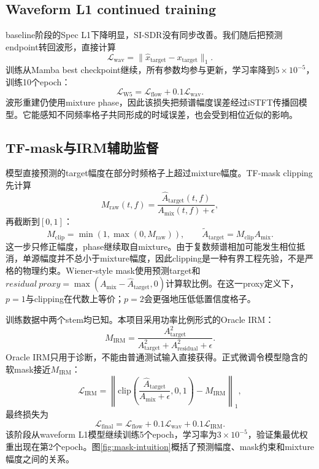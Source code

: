 \documentclass[UTF8,12pt,a4paper]{ctexart}
\begin{document}
\subsection{Waveform L1 continued training}

baseline阶段的Spec L1下降明显，SI-SDR没有同步改善。我们随后把预测endpoint转回波形，直接计算
\begin{equation}
  \mathcal L_{\mathrm{wav}}=\|\hat x_{\mathrm{target}}-x_{\mathrm{target}}\|_1.
\end{equation}
训练从Mamba best checkpoint继续，所有参数均参与更新，学习率降到$5\times10^{-5}$，训练10个epoch：
\begin{equation}
  \mathcal L_{\mathrm{W5}}=\mathcal L_{\mathrm{flow}}+0.1\mathcal L_{\mathrm{wav}}.
\end{equation}
波形重建仍使用mixture phase，因此该损失把频谱幅度误差经过iSTFT传播回模型。它能感知不同频率格子共同形成的时域误差，也会受到相位近似的影响。

\subsection{TF-mask与IRM辅助监督}

模型直接预测的target幅度在部分时频格子上超过mixture幅度。TF-mask clipping先计算
\begin{equation}
  M_{\mathrm{raw}}(t,f)=\frac{\hat A_{\mathrm{target}}(t,f)}{A_{\mathrm{mix}}(t,f)+\epsilon},
\end{equation}
再截断到$[0,1]$：
\begin{equation}
  M_{\mathrm{clip}}=\min(1,\max(0,M_{\mathrm{raw}})),\qquad
  \tilde A_{\mathrm{target}}=M_{\mathrm{clip}}A_{\mathrm{mix}}.
\end{equation}
这一步只修正幅度，phase继续取自mixture。由于复数频谱相加可能发生相位抵消，单源幅度并不总小于mixture幅度，因此clipping是一种有界工程先验，不是严格的物理约束。Wiener-style mask使用预测target和$residual\ proxy=\max(A_{\mathrm{mix}}-\hat A_{\mathrm{target}},0)$计算软比例。在这一proxy定义下，$p=1$与clipping在代数上等价；$p=2$会更强地压低低置信度格子。

训练数据中两个stem均已知。本项目采用功率比例形式的Oracle IRM：
\begin{equation}
  M_{\mathrm{IRM}}=\frac{A_{\mathrm{target}}^2}
  {A_{\mathrm{target}}^2+A_{\mathrm{residual}}^2+\epsilon}.
\end{equation}
Oracle IRM只用于诊断，不能由普通测试输入直接获得。正式微调令模型隐含的软mask接近$M_{\mathrm{IRM}}$：
\begin{equation}
  \mathcal L_{\mathrm{IRM}}=\left\lVert
  \mathrm{clip}\left(\frac{\hat A_{\mathrm{target}}}{A_{\mathrm{mix}}+\epsilon},0,1\right)
  -M_{\mathrm{IRM}}\right\rVert_1,
\end{equation}
最终损失为
\begin{equation}
  \mathcal L_{\mathrm{final}}=\mathcal L_{\mathrm{flow}}
  +0.1\mathcal L_{\mathrm{wav}}+0.1\mathcal L_{\mathrm{IRM}}.
\end{equation}
该阶段从waveform L1模型继续训练5个epoch，学习率为$3\times10^{-5}$，验证集最优权重出现在第2个epoch。图\ref{fig:mask-intuition}概括了预测幅度、mask约束和mixture幅度之间的关系。
\end{document}

